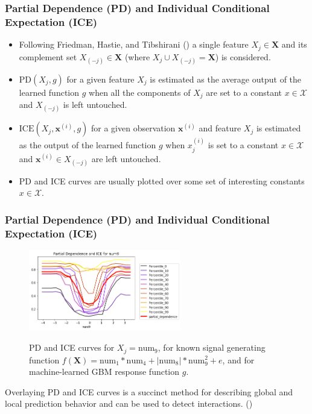 \documentclass[11pt,aspectratio=169,hyperref={colorlinks}]{beamer}
\begin{document}
	\begin{frame}
	
		\frametitle{Partial Dependence (PD) and Individual Conditional Expectation (ICE)}
		
		\vspace{-10 pt}
		
		\begin{itemize}
			
			\item Following Friedman, Hastie, and Tibshirani (\citeyear{esl}) a single feature $X_j \in \mathbf{X}$ and its complement set $X_{(-j)} \in \mathbf{X}$ (where $X_j \cup X_{(-j)} = \mathbf{X}$) is considered.
			
			\item $\text{PD}(X_j, g)$ for a given feature $X_j$ is estimated as the average output of the learned function $g$ when all the components of $X_j$ are set to a constant $x \in \mathcal{X}$ and $X_{(-j)}$ is left untouched.
			
			\item $\text{ICE}(X_j, \mathbf{x}^{(i)}, g)$ for a given observation $\mathbf{x}^{(i)}$ and feature $X_j$ is estimated as the output of the learned function $g$ when $x^{(i)}_j$ is set to a constant $x \in \mathcal{X}$ and $\mathbf{x}^{(i)} \in X_{(-j)}$ are left untouched.
			
			\item PD and ICE curves are usually plotted over some set of interesting constants $x \in \mathcal{X}$. 
			
		\end{itemize}
		
	\end{frame}
	
	\begin{frame}[t]
		
		\frametitle{Partial Dependence (PD) and Individual Conditional Expectation (ICE)}
		
		\begin{figure}[htb]
			\begin{center}
				\includegraphics[height=100pt]{../img/pdp_ice.png}
				\label{fig:pdp_ice}
				\caption{PD and ICE curves for $ X_j = \text{num}_9$, for known signal generating function $f(\mathbf{X}) = \text{num} _1 * \text{num}_4 + |\text{num}_8| * \text{num}_9^2 + e$, and for machine-learned GBM response function $g$.}
			\end{center}
		\end{figure}
		
		\vspace{-10pt}
		
		Overlaying PD and ICE curves is a succinct method for describing global and local prediction behavior and can be used to detect interactions. (\cite{ice_plots}) 
		
	\end{frame}
\end{document}
